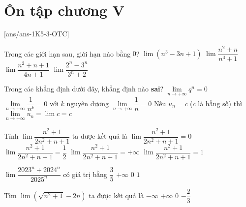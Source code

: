 \section{Ôn tập chương V}
[ans/ans-1K5-3-OTC]
\begin{ex}%
	Trong các giới hạn sau, giới hạn nào bằng $ 0 $?
	\choice
	{$ \lim(n^3-3n+1) $}
	{\True $ \lim\dfrac{n^2+n}{n^3+1} $}
	{$ \lim\dfrac{n^2+n+1}{4n+1} $}
	{$ \lim\dfrac{2^n-3^n}{3^n+2} $}
\end{ex}
\begin{ex}%
	Trong các khẳng định dưới đây, khẳng định nào \textbf{sai}?
	\choice
	{\True $\lim\limits_{n \to +\infty} q^n=0$}
	{$\lim\limits_{n \to +\infty} \dfrac{1}{n^k}=0$ với $k$ nguyên dương}
	{$\lim\limits_{n \to +\infty} \dfrac{1}{n}=0$}
	{Nếu $u_n=c$ ($c$ là hằng số) thì $\lim\limits_{n \to +\infty} u_n=\lim c=c$}
\end{ex}

\begin{ex}%
	Tính $\lim \dfrac{n^2+1}{2n^2+n+1}$ ta được kết quả là
	\choice
	{$\lim \dfrac{n^2+1}{2n^2+n+1}=0$}
	{\True $\lim \dfrac{n^2+1}{2n^2+n+1}=\dfrac{1}{2}$}
	{$\lim \dfrac{n^2+1}{2n^2+n+1}=+\infty $}
	{$\lim \dfrac{n^2+1}{2n^2+n+1}=1$}
\end{ex}

\begin{ex}%
	$\lim \dfrac{2023^n+2024^n}{2025^n}$ có giá trị bằng
	\choice
	{$\dfrac{3}{5}$}
	{$+\infty$}
	{\True $0$}
	{$1$}
\end{ex}

\begin{ex}%
	Tìm $\lim \left(\sqrt{n^2+1}-2n\right)$ ta được kết quả là
	\choice
	{\True $-\infty$}
	{$+\infty$}
	{$0$}
	{$-\dfrac{2}{3}$}
\end{ex}

